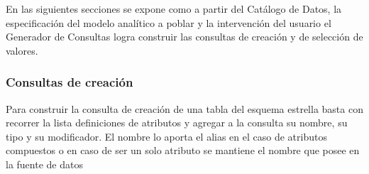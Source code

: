 En las siguientes secciones se expone como a partir del Catálogo de Datos, la especificaci\'on del 
modelo analítico a poblar y la intervenci\'on del usuario el Generador de Consultas logra construir 
las consultas de creaci\'on y de selecci\'on de valores.



\subsubsection{Consultas de creaci\'on}
Para construir la consulta de creaci\'on de una tabla del esquema estrella basta con recorrer 
la lista definiciones de atributos y agregar a la consulta su nombre, su tipo y su modificador. 
El nombre lo aporta el alias en el caso de atributos compuestos o en caso de ser un solo atributo 
se mantiene el nombre que posee en la fuente de datos